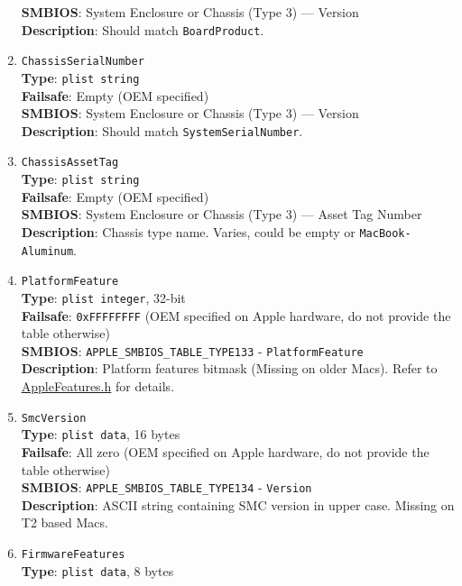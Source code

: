 \documentclass[]{article}
\begin{document}
\begin{enumerate}
  \textbf{SMBIOS}: System Enclosure or Chassis (Type 3) --- Version\\
  \textbf{Description}: Should match \texttt{BoardProduct}.
\item
  \texttt{ChassisSerialNumber}\\
  \textbf{Type}: \texttt{plist\ string}\\
  \textbf{Failsafe}: Empty (OEM specified)\\
  \textbf{SMBIOS}: System Enclosure or Chassis (Type 3) --- Version\\
  \textbf{Description}: Should match \texttt{SystemSerialNumber}.
\item
  \texttt{ChassisAssetTag}\\
  \textbf{Type}: \texttt{plist\ string}\\
  \textbf{Failsafe}: Empty (OEM specified)\\
  \textbf{SMBIOS}: System Enclosure or Chassis (Type 3) --- Asset Tag
  Number\\
  \textbf{Description}: Chassis type name. Varies, could be empty or
  \texttt{MacBook-Aluminum}.
\item
  \texttt{PlatformFeature}\\
  \textbf{Type}: \texttt{plist\ integer}, 32-bit\\
  \textbf{Failsafe}: \texttt{0xFFFFFFFF} (OEM specified on Apple hardware, do not provide the table otherwise)\\
  \textbf{SMBIOS}: \texttt{APPLE\_SMBIOS\_TABLE\_TYPE133} -
  \texttt{PlatformFeature}\\
  \textbf{Description}: Platform features bitmask (Missing on older Macs). Refer to
  \href{https://github.com/acidanthera/OpenCorePkg/blob/master/Include/Apple/IndustryStandard/AppleFeatures.h}{AppleFeatures.h} for details.
\item
  \texttt{SmcVersion}\\
  \textbf{Type}: \texttt{plist\ data}, 16 bytes\\
  \textbf{Failsafe}: All zero (OEM specified on Apple hardware, do not provide the table otherwise)\\
  \textbf{SMBIOS}: \texttt{APPLE\_SMBIOS\_TABLE\_TYPE134} - \texttt{Version}\\
  \textbf{Description}: ASCII string containing SMC version in upper case.
  Missing on T2 based Macs.
\item
  \texttt{FirmwareFeatures}\\
  \textbf{Type}: \texttt{plist\ data}, 8 bytes\\

\end{enumerate}
\end{document}
